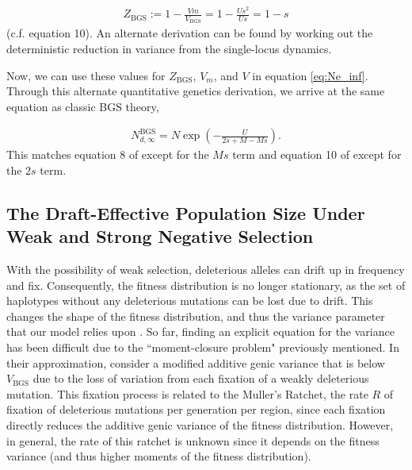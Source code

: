 \documentclass[11pt]{article}
\begin{document}
\begin{align}
  Z_\text{BGS} := 1 - \frac{Vm}{V_\text{BGS}} = 1 - \frac{Us^2}{Us} = 1 - s
\end{align}
%
(c.f. \cite{Santiago1998-bs} equation 10). An alternate derivation can be found
by working out the deterministic reduction in variance from the single-locus
dynamics. 

Now, we can use these values for $Z_\text{BGS}$, $V_m$, and $V$ in equation
\eqref{eq:Ne_inf}. Through this alternate quantitative genetics derivation, we
arrive at the same equation as classic BGS theory,

\begin{align}
  N_{d,\infty}^\text{BGS} = N \exp\left( - \frac{U}{2s + M - Ms} \right).
\end{align}
%
This matches equation 8 of \textcite{Hudson1995-xc} except for the $Ms$ term
and equation 10 of \textcite{Nordborg1996-nq} except for the $2s$ term.

\subsection{The Draft-Effective Population Size Under Weak and Strong Negative Selection}
\label{supp:weak-strong}

With the possibility of weak selection, deleterious alleles can drift up in
frequency and fix. Consequently, the fitness distribution is no longer
stationary, as the set of haplotypes without any deleterious mutations can be
lost due to drift. This changes the shape of the fitness distribution, and thus
the variance parameter that our model relies upon
\parencite{Gessler1995-hz,OFallon2010-my,Good2013-lp,Haigh1978-gt,Higgs1995-xc}.
So far, finding an explicit equation for the variance has been difficult due to
the ``moment-closure problem" previously mentioned. In their approximation,
\textcite{Santiago2016-mu} consider a modified additive genic variance that is
below $V_\text{BGS}$ due to the loss of variation from each fixation of a
weakly deleterious mutation. This fixation process is related to the Muller's
Ratchet, the rate $R$ of fixation of deleterious mutations per generation per
region, since each fixation directly reduces the additive genic variance of the
fitness distribution. However, in general, the rate of this ratchet is unknown
since it depends on the fitness variance (and thus higher moments of the
fitness distribution).

\end{document}
